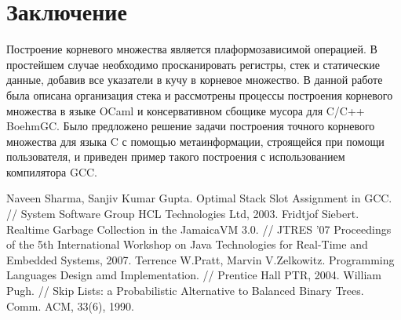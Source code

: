 \section*{Заключение}
Построение корневого множества является плаформозависимой операцией. В простейшем случае необходимо просканировать регистры, стек и статические данные, добавив все указатели в кучу в корневое множество. В данной работе была описана организация стека и рассмотрены процессы построения корневого множества в языке OCaml и консервативном сбощике мусора для C/C++ BoehmGC. Было предложено решение задачи построения точного корневого множества для языка C с помощью метаинформации, строящейся при помощи пользователя, и приведен пример такого построения с использованием компилятора GCC.


\begin{thebibliography}{1}
  Naveen Sharma, Sanjiv Kumar Gupta. Optimal Stack Slot Assignment in GCC. // System Software Group HCL Technologies Ltd, 2003.
  Fridtjof Siebert. Realtime Garbage Collection in the JamaicaVM 3.0. // JTRES '07 Proceedings of the 5th International Workshop on Java Technologies for Real-Time and Embedded Systems, 2007.
  Terrence W.Pratt, Marvin V.Zelkowitz. Programming Languages Design amd Implementation. // Prentice Hall PTR, 2004.
  William Pugh. // Skip Lists: a Probabilistic Alternative to Balanced Binary Trees. Comm. ACM, 33(6), 1990.
\end{thebibliography}
